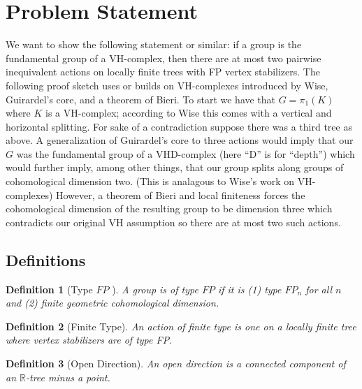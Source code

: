 \documentclass{article}
\theoremstyle{mystyle}
\newtheorem{defn}{Definition}
\theoremstyle{remark}
\begin{document}
\section{Problem Statement}


We want to show the following statement or similar: if a group is the fundamental group of a VH-complex, then there are at most two pairwise inequivalent actions on locally finite trees with FP vertex stabilizers. The following proof sketch uses or builds on VH-complexes introduced by Wise, Guirardel's core, and a theorem of Bieri. To start we have that \(G = \pi_1(K)\) where \(K\) is a VH-complex; according to Wise this comes with a vertical and horizontal splitting. For sake of a contradiction suppose there was a third tree as above. A generalization of Guirardel's core to three actions would imply that our \(G\) was the fundamental group of a VHD-complex (here ``D'' is for ``depth'') which would further imply, among other things, that our group splits along groups of cohomological dimension two. (This is analagous to Wise's work on VH-complexes) However, a theorem of Bieri and local finiteness forces the cohomological dimension of the resulting group to be dimension three which contradicts our original VH assumption so there are at most two such actions.

\subsection{Definitions}

\begin{defn}
	[Type \(FP\) ]
	A group is of type \(FP\) if it is (1) type \(FP_n\) for all \(n\) and (2) finite geometric cohomological dimension.
\end{defn}

\begin{defn}
	[Finite Type] 
	An action of {\em finite type} is one on a locally finite tree where  vertex stabilizers are of type FP.
\end{defn}

\begin{defn}[Open Direction] An open direction is a connected component of an \(\mathbb{R}\)-tree minus a point. 
\end{defn}
\end{document}

